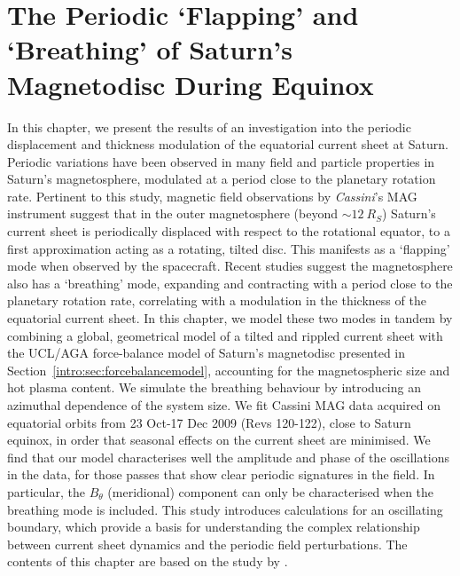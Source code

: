 \chapter[The Periodic Flapping and Breathing of Saturn's Magnetodisc]{The Periodic `Flapping' and `Breathing' of Saturn's Magnetodisc During Equinox}
\label{chap:equinox}
In this chapter, we present the results of an investigation into the periodic displacement and thickness modulation of the equatorial current sheet at Saturn. Periodic variations have been observed in many field and particle properties in Saturn's magnetosphere, modulated at a period close to the planetary rotation rate. Pertinent to this study, magnetic field observations by \textit{Cassini}'s MAG instrument suggest that in the outer magnetosphere (beyond ${\sim}\SI{12}{R_S}$) Saturn's current sheet is periodically displaced with respect to the rotational equator, to a first approximation acting as a rotating, tilted disc. This manifests as a `flapping' mode when observed by the spacecraft. Recent studies suggest the magnetosphere also has a `breathing' mode, expanding and contracting with a period close to the planetary rotation rate, correlating with a modulation in the thickness of the equatorial current sheet. In this chapter, we model these two modes in tandem by combining a global, geometrical model of a tilted and rippled current sheet with the UCL/AGA force-balance model of Saturn's magnetodisc presented in Section~\ref{intro:sec:forcebalancemodel}, accounting for the magnetospheric size and hot plasma content. We simulate the breathing behaviour by introducing an azimuthal dependence of the system size. We fit Cassini MAG data acquired on equatorial orbits from 23 Oct{\--}17 Dec 2009 (Revs 120{\--}122), close to Saturn equinox, in order that seasonal effects on the current sheet are minimised. We find that our model characterises well the amplitude and phase of the oscillations in the data, for those passes that show clear periodic signatures in the field. In particular, the $B_\theta$ (meridional) component can only be characterised when the breathing mode is included. This study introduces calculations for an oscillating boundary, which provide a basis for understanding the complex relationship between current sheet dynamics and the periodic field perturbations. The contents of this chapter are based on the study by \citet{sorba2018}.

